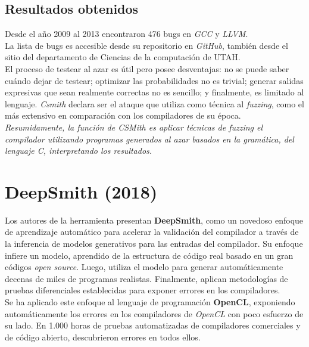 \subsection{Resultados obtenidos}
Desde el año 2009 al 2013 encontraron 476 bugs en \textit{GCC}\cite{gccbuglistcsmith} y \textit{LLVM}\cite{llvmbuglistcsmith}.\\

La lista de bugs es accesible desde su repositorio\cite{bugsreportedcsmith} en \textit{GitHub}, también desde el sitio del departamento de Ciencias de la computación de UTAH.\\

El proceso de testear al azar es útil pero posee desventajas: no se puede saber cuándo dejar de testear; optimizar las probabilidades no es trivial; generar salidas expresivas que sean realmente correctas no es sencillo; y finalmente, es limitado al lenguaje. \textit{Csmith} declara ser el ataque que utiliza como técnica al \textit{fuzzing}, como el más extensivo en comparación con los compiladores de su época.\\

\textit{Resumidamente, la función de CSMith es aplicar técnicas de fuzzing el compilador utilizando programas generados al azar basados en la gramática, del lenguaje C, interpretando los resultados.}

\section{DeepSmith (2018)}
\label{ref:deepsmith}
Los autores de la herramienta presentan \textbf{DeepSmith}\cite{Cummins:2018:CFT:3213846.3213848}, como un novedoso enfoque de aprendizaje automático para acelerar la validación del compilador a través de la inferencia de modelos generativos para las entradas del compilador. Su enfoque infiere un modelo, aprendido de la estructura de código real basado en un gran códigos \textit{open source}. Luego, utiliza el modelo para generar automáticamente decenas de miles de programas realistas. Finalmente, aplican metodologías de pruebas diferenciales establecidas para exponer errores en los compiladores.\\

Se ha aplicado este enfoque al lenguaje de programación \textbf{OpenCL}, exponiendo automáticamente los errores en los compiladores de \textit{OpenCL} con poco esfuerzo de su lado. En 1.000 horas de pruebas automatizadas de compiladores comerciales y de código abierto, descubrieron errores en todos ellos.

